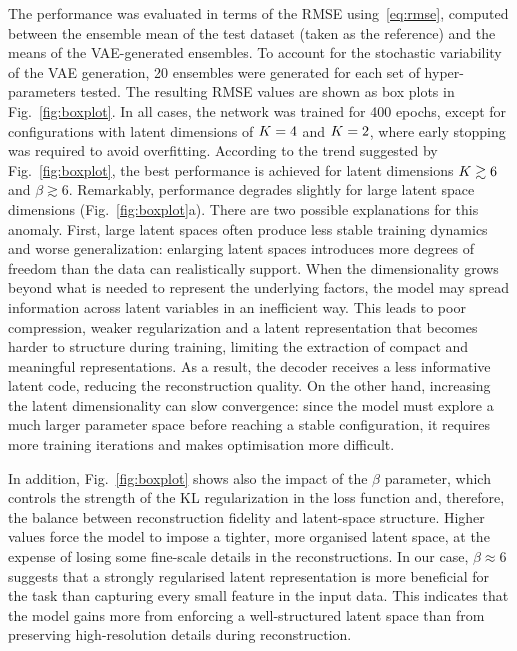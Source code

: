 %
%
The performance was evaluated in terms of the RMSE using~\eqref{eq:rmse}, computed between the ensemble mean of the test dataset (taken as the reference) and the means of the VAE-generated ensembles. To account for the stochastic variability of the VAE generation, 20 ensembles were generated for each set of hyper-parameters tested. The resulting RMSE values are shown as box plots in Fig.~\ref{fig:boxplot}.
%
%
In all cases, the network was trained for 400 epochs, except for configurations with latent dimensions of $K=4$ and $K=2$, where early stopping was required to avoid overfitting. According to the trend suggested by Fig.~\ref{fig:boxplot}, the best performance is achieved for latent dimensions $K \gtrsim 6$ and $\beta\gtrsim 6$. Remarkably, performance degrades slightly for large latent space dimensions (Fig.~\ref{fig:boxplot}a). There are two possible explanations for this anomaly.
%
%
First, large latent spaces often produce less stable training dynamics and worse generalization: enlarging latent spaces introduces more degrees of freedom than the data can realistically support. When the dimensionality grows beyond what is needed to represent the underlying factors, the model may spread information across latent variables in an inefficient way. This leads to poor compression, weaker regularization and a latent representation that becomes harder to structure during training, limiting the extraction of compact and meaningful representations. As a result, the decoder receives a less informative latent code, reducing the reconstruction quality. On the other hand, increasing the latent dimensionality can slow convergence: since the model must explore a much larger parameter space before reaching a stable configuration, it requires more training iterations and makes optimisation more difficult.

%
%
In addition, Fig.~\ref{fig:boxplot} shows also the impact of the $\beta$ parameter, which controls the strength of the KL regularization in the loss function and, therefore, the balance between reconstruction fidelity and latent-space structure. Higher values force the model to impose a tighter, more organised latent space, at the expense of losing some fine-scale details in the reconstructions. In our case, $\beta \approx 6$ suggests that a strongly regularised latent representation is more beneficial for the task than capturing every small feature in the input data. This indicates that the model gains more from enforcing a well-structured latent space than from preserving high-resolution details during reconstruction.

